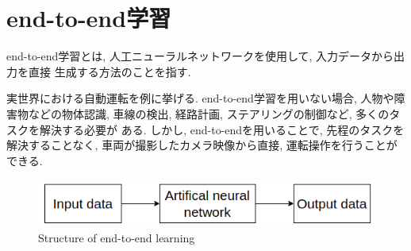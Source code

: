 
\section{end-to-end学習}
end-to-end学習とは, 人工ニューラルネットワークを使用して, 入力データから出力を直接
生成する方法のことを指す. \par 実世界における自動運転を例に挙げる. end-to-end学習を用いない場合, 人物や障害物などの物体認識, 車線の検出, 経路計画, ステアリングの制御など, 多くのタスクを解決する必要が
ある. しかし, end-to-endを用いることで, 先程のタスクを解決することなく, 車両が撮影したカメラ映像から直接, 運転操作を行うことができる. 
\vspace{5cm}

\begin{figure}[hbtp]
  \centering
 \includegraphics[keepaspectratio, scale=0.7]
      {images/end-to-end.png}
 \caption{Structure of end-to-end learning}
 \label{Fig:end-to-end}
\end{figure}

\newpage

